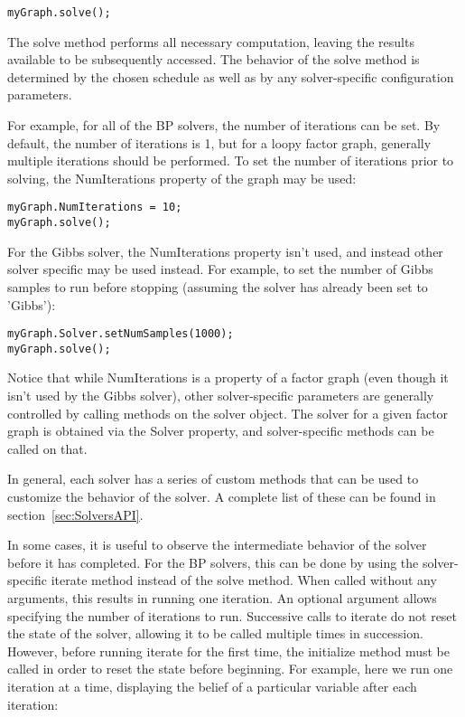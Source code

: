 \begin{lstlisting}
myGraph.solve();
\end{lstlisting}

The solve method performs all necessary computation, leaving the results available to be subsequently accessed.  The behavior of the solve method is determined by the chosen schedule as well as by any solver-specific configuration parameters.

For example, for all of the BP solvers, the number of iterations can be set.  By default, the number of iterations is 1, but for a loopy factor graph, generally multiple iterations should be performed.  To set the number of iterations prior to solving, the NumIterations property of the graph may be used:

\begin{lstlisting}
myGraph.NumIterations = 10;
myGraph.solve();
\end{lstlisting}

For the Gibbs solver, the NumIterations property isn't used, and instead other solver specific may be used instead.  For example, to set the number of Gibbs samples to run before stopping (assuming the solver has already been set to 'Gibbs'):

\begin{lstlisting}
myGraph.Solver.setNumSamples(1000);
myGraph.solve();
\end{lstlisting}

Notice that while NumIterations is a property of a factor graph (even though it isn't used by the Gibbs solver), other solver-specific parameters are generally controlled by calling methods on the solver object.  The solver for a given factor graph is obtained via the Solver property, and solver-specific methods can be called on that.

In general, each solver has a series of custom methods that can be used to customize the behavior of the solver.  A complete list of these can be found in section~\ref{sec:SolversAPI}.

In some cases, it is useful to observe the intermediate behavior of the solver before it has completed.  For the BP solvers, this can be done by using the solver-specific iterate method instead of the solve method.  When called without any arguments, this results in running one iteration.  An optional argument allows specifying the number of iterations to run.  Successive calls to iterate do not reset the state of the solver, allowing it to be called multiple times in succession.  However, before running iterate for the first time, the initialize method must be called in order to reset the state before beginning.  For example, here we run one iteration at a time, displaying the belief of a particular variable after each iteration:


